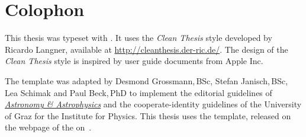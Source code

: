 %

\pagestyle{empty}
\hfill
\vfill
{}
\section*{Colophon}

This thesis was typeset with \LaTeXe.
It uses the \textit{Clean Thesis} style developed by Ricardo Langner, available at \href{http://cleanthesis.der-ric.de/}{http://cleanthesis.der-ric.de/}. The design of the \textit{Clean Thesis} style is inspired by user guide documents from Apple Inc. 


The template was adapted by {Desmond Grossmann,\,BSc, Stefan Janisch,\,BSc, Lea Schimak and Paul Beck,\,PhD} to implement the editorial guidelines of \href{https://www.aanda.org/doc_journal/instructions/aadoc.pdf}{\textit{Astronomy \& Astrophysics}} and the cooperate-identity guidelines of the University of Graz for the Institute for Physics. This thesis uses the template, released on the webpage of the  \hbox{on .}


